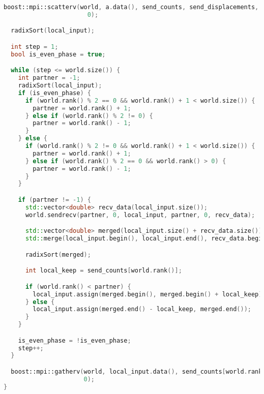 \documentclass[a4paper,12pt]{article}
\begin{document}
\begin{lstlisting}[language=C++,caption={Код программы}]
  boost::mpi::scatterv(world, a.data(), send_counts, send_displacements, local_input.data(), send_counts[world.rank()],
                       0);

  radixSort(local_input);

  int step = 1;
  bool is_even_phase = true;

  while (step <= world.size()) {
    int partner = -1;
    radixSort(local_input);
    if (is_even_phase) {
      if (world.rank() % 2 == 0 && world.rank() + 1 < world.size()) {
        partner = world.rank() + 1;
      } else if (world.rank() % 2 != 0) {
        partner = world.rank() - 1;
      }
    } else {
      if (world.rank() % 2 != 0 && world.rank() + 1 < world.size()) {
        partner = world.rank() + 1;
      } else if (world.rank() % 2 == 0 && world.rank() > 0) {
        partner = world.rank() - 1;
      }
    }

    if (partner != -1) {
      std::vector<double> recv_data(local_input.size());
      world.sendrecv(partner, 0, local_input, partner, 0, recv_data);

      std::vector<double> merged(local_input.size() + recv_data.size());
      std::merge(local_input.begin(), local_input.end(), recv_data.begin(), recv_data.end(), merged.begin());

      radixSort(merged);

      int local_keep = send_counts[world.rank()];

      if (world.rank() < partner) {
        local_input.assign(merged.begin(), merged.begin() + local_keep);
      } else {
        local_input.assign(merged.end() - local_keep, merged.end());
      }
    }

    is_even_phase = !is_even_phase;
    step++;
  }

  boost::mpi::gatherv(world, local_input.data(), send_counts[world.rank()], a.data(), send_counts, send_displacements,
                      0);
}
\end{lstlisting}
\end{document}
